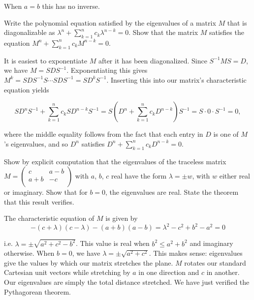 \documentclass[../group-theory-in-a-nutshell-for-physicists.tex]{subfiles}
\begin{document}
\begin{questions}
\begin{solution}
When \(a = b\) this has no inverse.
\end{solution}

\question Write the polynomial equation satisfied by the eigenvalues of a matrix
$M$ that is diagonalizable as
$\lambda^{n} + \sum_{k = 1}^{n}c_{k}\lambda^{n - k} = 0$. Show that
the matrix $M$ satisfies the equation
$M^{n} + \sum_{k = 1}^{n}c_{k}M^{n - k} = 0$.

\begin{solution}
It is easiest to exponentiate $M$ after it has been diagonalized.
Since $S^{- 1}MS = D$, we have $M = SDS^{- 1}$. Exponentiating this
gives $M^{k} = SDS^{- 1}S\cdots SDS^{- 1} = SD^{k}S^{- 1}$. Inserting
this into our matrix's characteristic equation yields

\[
SD^{n}S^{- 1} + \overset{n}{\sum_{k = 1}}c_{k}SD^{n - k}S^{- 1} = S(D^{n} + \overset{n}{\sum_{k = 1}}c_{k}D^{n - k})S^{- 1} = S \cdot 0 \cdot S^{- 1} = 0,\]

where the middle equality follows from the fact that each entry in $D$
is one of $M$'s eigenvalues, and so $D^n$ satisfies
$D^{n} + \sum_{k = 1}^{n}c_{k}D^{n - k} = 0$.
\end{solution}

\question Show by explicit computation that the eigenvalues of the traceless
matrix $M = \begin{pmatrix}
c & a - b \\
a + b & - c \\
\end{pmatrix}$ with $a$, $b$, $c$ real have the form
$\lambda = {\pm w}$, with $w$ either real or imaginary. Show that
for $b = 0$, the eigenvalues are real. State the theorem that this
result verifies.

\begin{solution}
The characteristic equation of $M$ is given by
\[
- (c + \lambda)(c - \lambda) - (a + b)(a - b) = \lambda^{2} - c^{2} + b^{2} - a^{2} = 0
\]

i.e. $\lambda = \pm \sqrt{a^{2} + c^{2} - b^{2}}$. This value is real
when $b^{2} \leq a^{2} + b^{2}$ and imaginary otherwise. When
$b = 0$, we have $\lambda = \pm \sqrt{a^{2} + c^{2}}$. This makes
sense: eigenvalues give the values by which our matrix stretches the
plane. $M$ rotates our standard Cartesian unit vectors while
stretching by $a$ in one direction and $c$ in another. Our
eigenvalues are simply the total distance stretched. We have just
verified the Pythagorean theorem.
\end{solution}


\end{questions}
\end{document}
